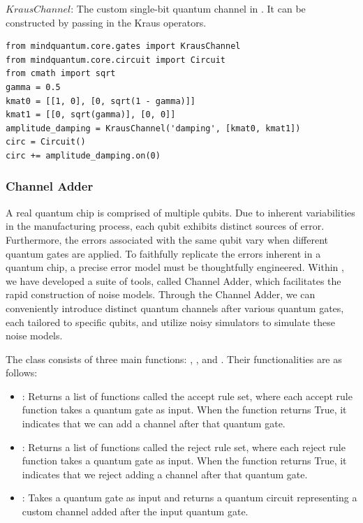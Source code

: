 $Kraus Channel$: The custom single-bit quantum channel in \MindQuantum. It can be constructed by passing in the Kraus operators.
\begin{lstlisting}
from mindquantum.core.gates import KrausChannel
from mindquantum.core.circuit import Circuit
from cmath import sqrt
gamma = 0.5
kmat0 = [[1, 0], [0, sqrt(1 - gamma)]]
kmat1 = [[0, sqrt(gamma)], [0, 0]]
amplitude_damping = KrausChannel('damping', [kmat0, kmat1])
circ = Circuit()
circ += amplitude_damping.on(0)
\end{lstlisting}

\subsubsection{Channel Adder}
A real quantum chip is comprised of multiple qubits. Due to inherent variabilities in the manufacturing process, each qubit exhibits distinct sources of error. Furthermore, the errors associated with the same qubit vary when different quantum gates are applied. To faithfully replicate the errors inherent in a quantum chip, a precise error model must be thoughtfully engineered. Within \MindQuantum, we have developed a suite of tools, called Channel Adder, which facilitates the rapid construction of noise models. Through the Channel Adder, we can conveniently introduce distinct quantum channels after various quantum gates, each tailored to specific qubits, and utilize noisy simulators to simulate these noise models.

The \ChannelAdder class consists of three main functions: , , and . Their functionalities are as follows:
\begin{itemize}
    \item {}: Returns a list of functions called the accept rule set, where each accept rule function takes a quantum gate as input. When the function returns True, it indicates that we can add a channel after that quantum gate.
    \item {}: Returns a list of functions called the reject rule set, where each reject rule function takes a quantum gate as input. When the function returns True, it indicates that we reject adding a channel after that quantum gate.
    \item {}: Takes a quantum gate as input and returns a quantum circuit representing a custom channel added after the input quantum gate.
\end{itemize}

